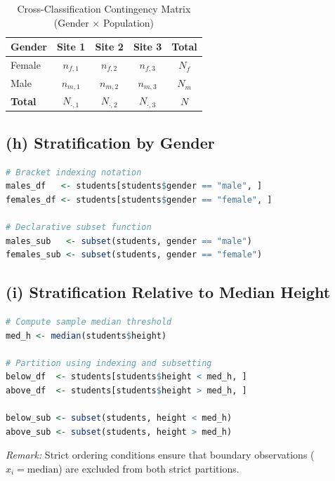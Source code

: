 \documentclass[11pt, a4paper]{article}
\begin{document}
\begin{table}[htbp]
  \centering
  \caption{Cross-Classification Contingency Matrix (Gender $\times$ Population)}
  \label{tab:contingency}
  \vspace{0.4em}
  \begin{tabular}{lcccc}
    \toprule
    \textbf{Gender} & \textbf{Site 1} & \textbf{Site 2} & \textbf{Site 3} & \textbf{Total} \\
    \midrule
    Female          & $n_{f,1}$       & $n_{f,2}$       & $n_{f,3}$       & $N_f$          \\
    Male            & $n_{m,1}$       & $n_{m,2}$       & $n_{m,3}$       & $N_m$          \\
    \midrule
    \textbf{Total}  & $N_{\cdot,1}$   & $N_{\cdot,2}$   & $N_{\cdot,3}$   & $N$            \\
    \bottomrule
  \end{tabular}
\end{table}

\subsection{(h) Stratification by Gender}
\begin{lstlisting}[language=R]
# Bracket indexing notation
males_df   <- students[students$gender == "male", ]
females_df <- students[students$gender == "female", ]

# Declarative subset function
males_sub   <- subset(students, gender == "male")
females_sub <- subset(students, gender == "female")
\end{lstlisting}

\subsection{(i) Stratification Relative to Median Height}
\begin{lstlisting}[language=R]
# Compute sample median threshold
med_h <- median(students$height)

# Partition using indexing and subsetting
below_df  <- students[students$height < med_h, ]
above_df  <- students[students$height > med_h, ]

below_sub <- subset(students, height < med_h)
above_sub <- subset(students, height > med_h)
\end{lstlisting}
\textit{Remark:} Strict ordering conditions ensure that boundary observations ($x_i = \text{median}$) are excluded from both strict partitions.
\end{document}
